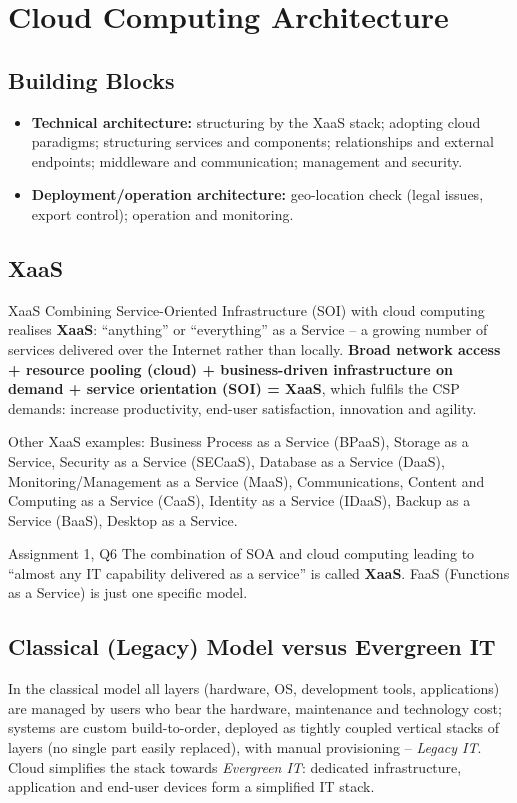 \section{Cloud Computing Architecture}
\subsection{Building Blocks}
\begin{itemize}[leftmargin=*]
  \item \textbf{Technical architecture:} structuring by the XaaS stack; adopting cloud paradigms;
        structuring services and components; relationships and external endpoints; middleware and
        communication; management and security.
  \item \textbf{Deployment/operation architecture:} geo-location check (legal issues, export control);
        operation and monitoring.
\end{itemize}

\subsection{XaaS}
\begin{defbox}{XaaS}
Combining Service-Oriented Infrastructure (SOI) with cloud computing realises \textbf{XaaS}: ``anything'' or
``everything'' as a Service -- a growing number of services delivered over the Internet rather than
locally. \textbf{Broad network access + resource pooling (cloud) + business-driven infrastructure on demand +
service orientation (SOI) = XaaS}, which fulfils the CSP demands: increase productivity, end-user
satisfaction, innovation and agility.
\end{defbox}
Other XaaS examples: Business Process as a Service (BPaaS), Storage as a Service, Security as a Service
(SECaaS), Database as a Service (DaaS), Monitoring/Management as a Service (MaaS), Communications, Content and
Computing as a Service (CaaS), Identity as a Service (IDaaS), Backup as a Service (BaaS), Desktop as a Service.

\begin{notebox}{Assignment 1, Q6}
The combination of SOA and cloud computing leading to ``almost any IT capability delivered as a service'' is
called \textbf{XaaS}. FaaS (Functions as a Service) is just one specific model.
\end{notebox}

\subsection{Classical (Legacy) Model versus Evergreen IT}
In the classical model all layers (hardware, OS, development tools, applications) are managed by users who
bear the hardware, maintenance and technology cost; systems are custom build-to-order, deployed as
tightly coupled vertical stacks of layers (no single part easily replaced), with manual provisioning --
\emph{Legacy IT}. Cloud simplifies the stack towards \emph{Evergreen IT}: dedicated infrastructure,
application and end-user devices form a simplified IT stack.

